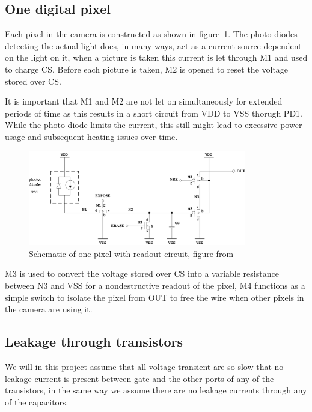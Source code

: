 
\subsection{One digital pixel}


Each pixel in the camera is constructed as shown in figure~\ref{fig:pixelschematic}.
The photo diodes detecting the actual light does, in many ways, act as a current source dependent on the light on it, when a picture is taken this
current is let through M1 and used to charge CS.
Before each picture is taken, M2 is opened to reset the voltage stored over CS.

It is important that M1 and M2 are not let on simultaneously for extended periods of time as this results in a short circuit from VDD to VSS thorugh PD1.
While the photo diode limits the current, this still might lead to excessive power usage and subsequent heating issues over time.


\begin{figure}[htbp]
  \centering
  \includegraphics[width=0.85\textwidth]{figures/pixel}
  \caption{Schematic of one pixel with readout circuit, figure from~\cite{oppgave}}\label{fig:pixelschematic}
\end{figure}


M3 is used to convert the voltage stored over CS into a variable resistance between N3 and VSS for a nondestructive readout of the pixel,
M4 functions as a simple switch to isolate the pixel from OUT to free the wire when other pixels in the camera are using it.


\subsection{Leakage through transistors} \label{sec:leakagecurrent}

We will in this project assume that all voltage transient are so slow that no leakage current is present between gate and the other ports of any of the transistors,
in the same way we assume there are no leakage currents through any of the capacitors.

